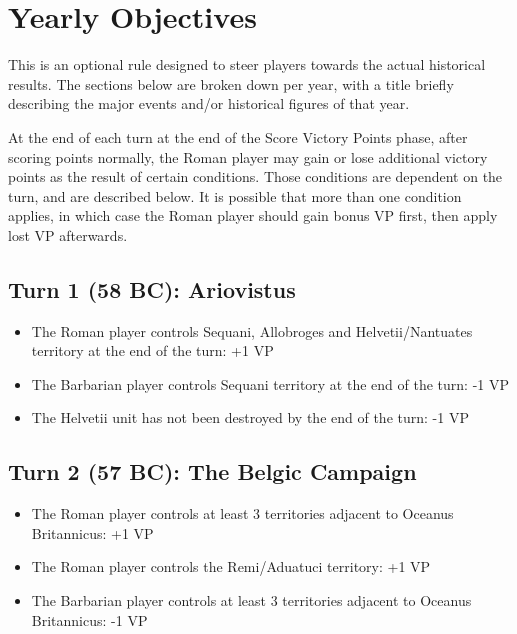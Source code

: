 \section{Yearly Objectives}
This is an optional rule designed to steer players towards the actual historical results. The sections below are broken down per year, with a title briefly describing the major events and/or historical figures of that year.

At the end of each turn at the end of the Score Victory Points phase, after scoring points normally, the Roman player may gain or lose additional victory points as the result of certain conditions. Those conditions are dependent on the turn, and are described below. It is possible that more than one condition applies, in which case the Roman player should gain bonus VP first, then apply lost VP afterwards.

\subsection{Turn 1 (58 BC): Ariovistus}
\begin{itemize}
  \setlength\itemsep{0em}
  \item The Roman player controls Sequani, Allobroges and Helvetii/Nantuates territory at the end of the turn: +1 VP
  \item The Barbarian player controls Sequani territory at the end of the turn: -1 VP
  \item The Helvetii unit has not been destroyed by the end of the turn: -1 VP
\end{itemize}

\subsection{Turn 2 (57 BC): The Belgic Campaign}
\begin{itemize}
  \setlength\itemsep{0em}
  \item The Roman player controls at least 3 territories adjacent to Oceanus Britannicus: +1 VP
  \item The Roman player controls the Remi/Aduatuci territory: +1 VP
  \item The Barbarian player controls at least 3 territories adjacent to Oceanus Britannicus: -1 VP
\end{itemize}

